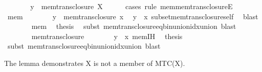 \begin{isabellebody}
\ \ \ \ \isamarkupfalse%
\ \isamarkupfalse%
\ {\isachardoublequoteopen}y\ {\isasymin}\ mem{\isacharunderscore}{\kern0pt}trans{\isacharunderscore}{\kern0pt}closure\ X{\isachardoublequoteclose}\isanewline
\ \ \ \ \isamarkupfalse%
\ {\isacharparenleft}{\kern0pt}cases\ rule{\isacharcolon}{\kern0pt}\ mem{\isacharunderscore}{\kern0pt}mem{\isacharunderscore}{\kern0pt}trans{\isacharunderscore}{\kern0pt}closureE{\isacharparenright}{\kern0pt}\isanewline
\ \ \ \ \ \ \isamarkupfalse%
\ mem\isanewline
\ \ \ \ \ \ \isamarkupfalse%
\ {\isachardoublequoteopen}y\ {\isasymin}\ mem{\isacharunderscore}{\kern0pt}trans{\isacharunderscore}{\kern0pt}closure\ x{\isachardoublequoteclose}\ \isamarkupfalse%
\ {\isacartoucheopen}y\ {\isasymin}\ x{\isacartoucheclose}\ subset{\isacharunderscore}{\kern0pt}mem{\isacharunderscore}{\kern0pt}trans{\isacharunderscore}{\kern0pt}closure{\isacharunderscore}{\kern0pt}self\ \isamarkupfalse%
\ blast\isanewline
\ \ \ \ \ \ \isamarkupfalse%
\ mem\ \isamarkupfalse%
\ {\isacharquery}{\kern0pt}thesis\ \isamarkupfalse%
\ {\isacharparenleft}{\kern0pt}subst\ mem{\isacharunderscore}{\kern0pt}trans{\isacharunderscore}{\kern0pt}closure{\isacharunderscore}{\kern0pt}eq{\isacharunderscore}{\kern0pt}bin{\isacharunderscore}{\kern0pt}union{\isacharunderscore}{\kern0pt}idx{\isacharunderscore}{\kern0pt}union{\isacharparenright}{\kern0pt}\ blast\isanewline
\ \ \ \ \isamarkupfalse%
\isanewline
\ \ \ \ \ \ \isamarkupfalse%
\ mem{\isacharunderscore}{\kern0pt}trans{\isacharunderscore}{\kern0pt}closure\isanewline
\ \ \ \ \ \ \isamarkupfalse%
\ {\isacartoucheopen}y\ {\isasymin}\ x{\isacartoucheclose}\ mem{\isachardot}{\kern0pt}IH\ \isamarkupfalse%
\ {\isacharquery}{\kern0pt}thesis\ \isamarkupfalse%
\ {\isacharparenleft}{\kern0pt}subst\ mem{\isacharunderscore}{\kern0pt}trans{\isacharunderscore}{\kern0pt}closure{\isacharunderscore}{\kern0pt}eq{\isacharunderscore}{\kern0pt}bin{\isacharunderscore}{\kern0pt}union{\isacharunderscore}{\kern0pt}idx{\isacharunderscore}{\kern0pt}union{\isacharparenright}{\kern0pt}\ blast\isanewline
\ \ \ \ \isamarkupfalse%
\isanewline
\ \ \isamarkupfalse%
\isanewline
{}\isamarkupfalse%
%
\endisatagproof
{\isafoldproof}%
%
\isadelimproof
%
\endisadelimproof
%
\begin{isamarkuptext}%
The lemma demonstrates X is not a member of MTC(X).%

\end{isamarkuptext}
\end{isabellebody}
